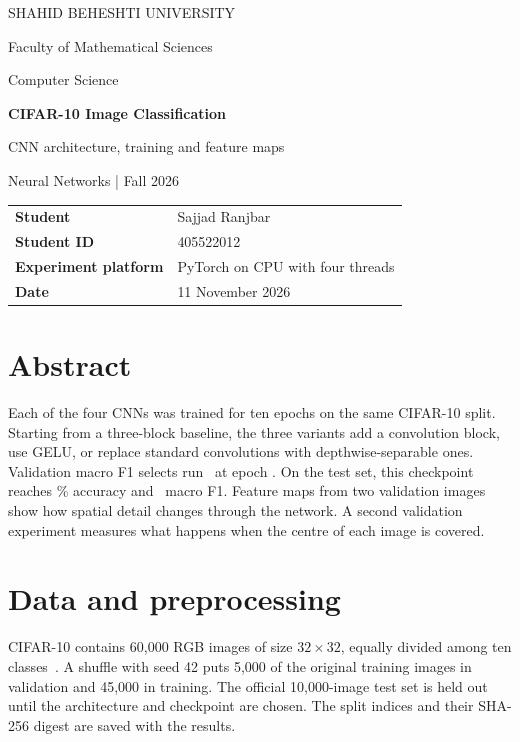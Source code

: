 \documentclass[11pt,a4paper]{article}
\begin{document}
\begin{titlepage}
\vspace*{17mm}
{\large\color{accent} SHAHID BEHESHTI UNIVERSITY\par}
{\large Faculty of Mathematical Sciences\par}
{\large Computer Science\par}
\vspace{26mm}
{\Huge\bfseries\color{ink} CIFAR-10 Image Classification\par}
\vspace{5mm}
{\LARGE CNN architecture, training and feature maps\par}
\vspace{16mm}
{\large Neural Networks \enspace | \enspace Fall 2026\par}
\vfill
\begin{tabular}{@{}ll@{}}
\textbf{Student} & Sajjad Ranjbar\\[4pt]
\textbf{Student ID} & 405522012\\[4pt]
\textbf{Experiment platform} & PyTorch on CPU with four threads\\[4pt]
\textbf{Date} & 11 November 2026
\end{tabular}
\vspace{15mm}
\end{titlepage}

\section*{Abstract}
Each of the four CNNs was trained for ten epochs on the same CIFAR-10 split.
Starting from a three-block baseline, the three variants add a convolution block,
use GELU, or replace standard convolutions with depthwise-separable ones.
Validation macro F1 selects run \WinningRun\ at epoch \WinningEpoch. On
the test set, this checkpoint reaches \TestAccuracy\% accuracy and
\TestMacroFone\ macro F1. Feature maps from two validation images show how
spatial detail changes through the network. A second validation experiment
measures what happens when the centre of each image is covered.

\section{Data and preprocessing}
CIFAR-10 contains 60,000 RGB images of size $32\times32$, equally divided
among ten classes~\cite{cifar}. A shuffle with seed 42 puts 5,000 of the
original training images in validation and 45,000 in training. The official
10,000-image test set is held out until the architecture and checkpoint are
chosen. The split indices and their SHA-256 digest are saved with the results.
\end{document}
